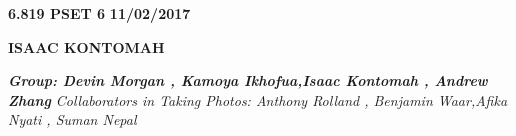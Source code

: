 \documentclass[a4paper,12pt]{article}
\begin{document}
\begin{flushleft}\newline \textbf{6.819 PSET 6}
\newline \textbf{11/02/2017}
\end{flushleft}
\newline \begin{center}\textbf{ISAAC KONTOMAH}
\end{center}
\begin{flushleft}
\newline \emph{\textbf{Group: Devin Morgan , Kamoya Ikhofua,Isaac Kontomah , Andrew Zhang}}
\newline \emph{Collaborators in Taking Photos: Anthony Rolland , Benjamin Waar,Afika Nyati , Suman Nepal}
\end{flushleft}
\end{document}
